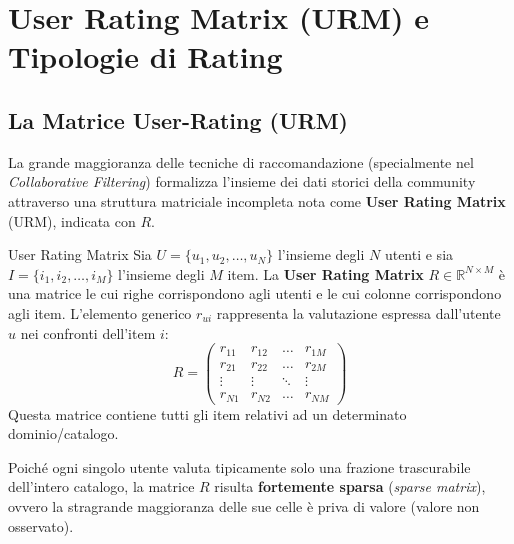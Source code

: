 \newpage


\section{User Rating Matrix (URM) e Tipologie di Rating}

\subsection{La Matrice User-Rating (URM)}
La grande maggioranza delle tecniche di raccomandazione (specialmente nel \textit{Collaborative Filtering}) formalizza l'insieme dei dati storici della community attraverso una struttura matriciale incompleta nota come \textbf{User Rating Matrix} (URM), indicata con $R$.

\begin{definition}{User Rating Matrix}
Sia $U = \{u_1, u_2, \dots, u_N\}$ l'insieme degli $N$ utenti e sia $I = \{i_1, i_2, \dots, i_M\}$ l'insieme degli $M$ item. La \textbf{User Rating Matrix} $R \in \mathbb{R}^{N \times M}$ è una matrice le cui righe corrispondono agli utenti e le cui colonne corrispondono agli item. L'elemento generico $r_{ui}$ rappresenta la valutazione espressa dall'utente $u$ nei confronti dell'item $i$:
\[
R = \begin{pmatrix}
r_{11} & r_{12} & \dots & r_{1M} \\
r_{21} & r_{22} & \dots & r_{2M} \\
\vdots & \vdots & \ddots & \vdots \\
r_{N1} & r_{N2} & \dots & r_{NM}
\end{pmatrix}
\]
Questa matrice contiene tutti gli item relativi ad un determinato dominio/catalogo.
\end{definition}


Poiché ogni singolo utente valuta tipicamente solo una frazione trascurabile dell'intero catalogo, la matrice $R$ risulta \textbf{fortemente sparsa} (\textit{sparse matrix}), ovvero la stragrande maggioranza delle sue celle è priva di valore (valore non osservato).

